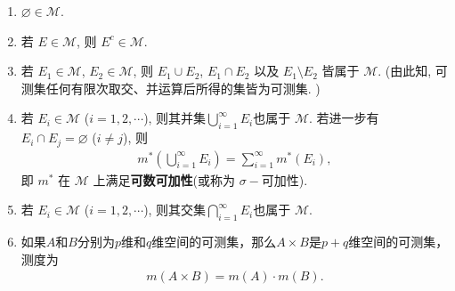 \documentclass[../../main.tex]{subfiles}%
\begin{document}
\begin{theorem}[可测集的性质]\label{theorem:可测集的性质}
\begin{enumerate}[(1)]
\item \(\varnothing \in \mathscr{M}\).
\item 若 \(E \in \mathscr{M}\), 则 \(E^c \in \mathscr{M}\).

\item 若 \(E_1 \in \mathscr{M}\), \(E_2 \in \mathscr{M}\), 则 \(E_1 \cup E_2\), \(E_1 \cap E_2\) 以及 \(E_1 \setminus E_2\) 皆属于 \(\mathscr{M}\). (由此知, 可测集任何有限次取交、并运算后所得的集皆为可测集. )
\item 若 \(E_i \in \mathscr{M}\) (\(i = 1,2,\cdots\)), 则其并集$\bigcup_{i = 1}^{\infty} E_i$也属于 \(\mathscr{M}\). 若进一步有 \(E_i \cap E_j = \varnothing\) (\(i \neq j\)), 则
\begin{align*}
m^*\left(\bigcup_{i = 1}^{\infty} E_i\right) = \sum_{i = 1}^{\infty} m^*(E_i),
\end{align*}
即 \(m^*\) 在 \(\mathscr{M}\) 上满足\textbf{可数可加性}(或称为 \(\sigma -\)可加性).

\item\label{theorem:可测集的性质-5} 若 \(E_i \in \mathscr{M}\) (\(i = 1,2,\cdots\)), 则其交集$\bigcap_{i = 1}^{\infty} E_i$也属于 \(\mathscr{M}\). 

\item 如果$A$和$B$分别为$p$维和$q$维空间的可测集，那么$A\times B$是$p + q$维空间的可测集，测度为
\begin{align*}
m(A\times B)=m(A)\cdot m(B).
\end{align*}
\end{enumerate}
\end{theorem}
\end{document}
